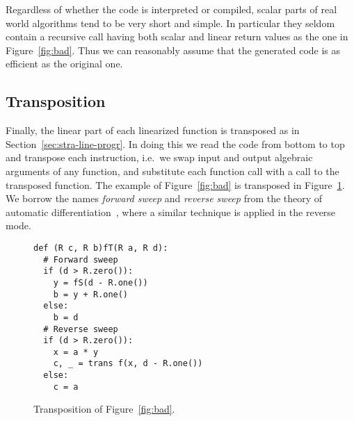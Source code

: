 \begin{remark}
  Regardless of whether the code is interpreted or compiled, scalar
  parts of real world algorithms tend to be very short and simple. In
  particular they seldom contain a recursive call having both scalar
  and linear return values as the one in Figure~\ref{fig:bad}. Thus we
  can reasonably assume that the generated code is as efficient as the
  original one.
\end{remark}

\ifbfive\enlargethispage{\baselineskip}\fi
\subsection{Transposition}
\label{sec:transposition}
Finally, the linear part of each linearized function is transposed as
in Section~\ref{sec:stra-line-progr}. In doing this we read the code
from bottom to top and transpose each instruction, i.e.\ we swap input
and output algebraic arguments of any function, and substitute each
function call with a call to the transposed function. The example of
Figure~\ref{fig:bad} is transposed in Figure~\ref{fig:mechant}. We
borrow the names \emph{forward sweep} and
\emph{reverse sweep} from the theory of automatic
differentiation~\cite{griewank2008evaluating}, where a similar
technique is applied in the reverse mode.

\begin{figure}[t]
  \centering
\begin{lstlisting}
def (R c, R b)fT(R a, R d):
  # Forward sweep
  if (d > R.zero()):
    y = fS(d - R.one())
    b = y + R.one()
  else:
    b = d
  # Reverse sweep
  if (d > R.zero()):
    x = a * y
    c, _ = trans f(x, d - R.one())
  else:
    c = a
\end{lstlisting}
  \caption{Transposition of Figure~\ref{fig:bad}.}
  \label{fig:mechant}
\end{figure}




